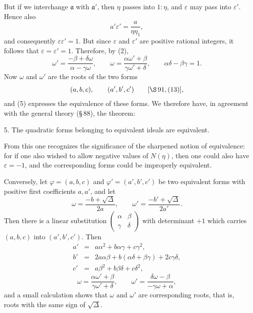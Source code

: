 \documentclass[11pt]{article}
\begin{document}
But if we interchange $\mathfrak a$ with $\mathfrak a'$, then $\eta$ passes into $1:\eta$, and $\varepsilon$ may pass into $\varepsilon'$. Hence also
\begin{equation}
 a'\varepsilon'=\frac{a}{\eta\eta_1},
\tag{4}
\end{equation}
and consequently $\varepsilon\varepsilon'=1$. But since $\varepsilon$ and $\varepsilon'$ are positive rational integers, it follows that $\varepsilon=\varepsilon'=1$. Therefore, by (2),
\begin{equation}
 \omega'=\frac{-\beta+\delta\omega}{\alpha-\gamma\omega},\qquad
 \omega=\frac{\alpha\omega'+\beta}{\gamma\omega'+\delta},\qquad
 \alpha\delta-\beta\gamma=1.
\tag{5}
\end{equation}
Now $\omega$ and $\omega'$ are the roots of the two forms
\[
 (a,b,c),\qquad (a',b',c') \qquad [\S\,91,(13)],
\]
and (5) expresses the equivalence of these forms. We therefore have, in agreement with the general theory (\S\,88), the theorem:

5. The quadratic forms belonging to equivalent ideals are equivalent.

From this one recognizes the significance of the sharpened notion of equivalence: for if one also wished to allow negative values of $N(\eta)$, then one could also have $\varepsilon=-1$, and the corresponding forms could be improperly equivalent.

Conversely, let $\varphi=(a,b,c)$ and $\varphi'=(a',b',c')$ be two equivalent forms with positive first coefficients $a,a'$, and let
\begin{equation}
 \omega=\frac{-b+\sqrt\Delta}{2a},\qquad
 \omega'=\frac{-b'+\sqrt\Delta}{2a'}.
\tag{6}
\end{equation}
Then there is a linear substitution $\begin{pmatrix}\alpha&\beta\\ \gamma&\delta\end{pmatrix}$ with determinant $+1$ which carries $(a,b,c)$ into $(a',b',c')$. Then
\begin{equation}
\begin{array}{rcl}
 a'&=&a\alpha^2+b\alpha\gamma+c\gamma^2,\\
 b'&=&2a\alpha\beta+b(\alpha\delta+\beta\gamma)+2c\gamma\delta,\\
 c'&=&a\beta^2+b\beta\delta+c\delta^2,
\end{array}
\tag{7}
\end{equation}
\begin{equation}
 \omega=\frac{\alpha\omega'+\beta}{\gamma\omega'+\delta},\qquad
 \omega'=\frac{\delta\omega-\beta}{-\gamma\omega+\alpha},
\tag{8}
\end{equation}
and a small calculation shows that $\omega$ and $\omega'$ are corresponding roots, that is, roots with the same sign of $\sqrt\Delta$.
\end{document}
